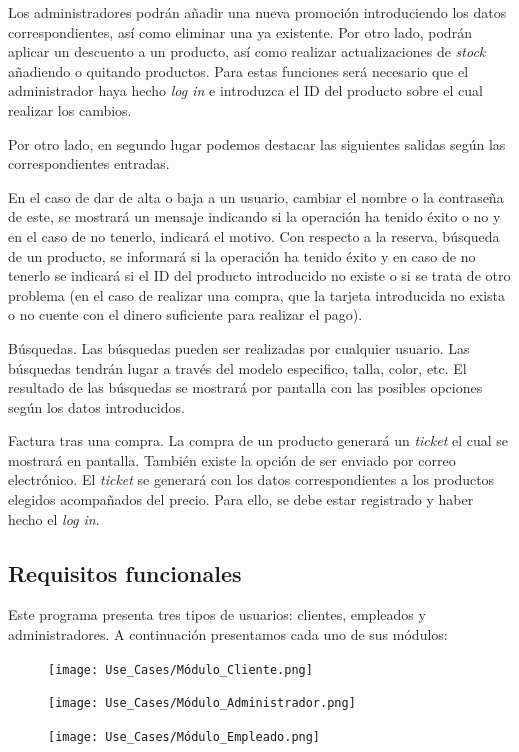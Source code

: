Los administradores podrán añadir una nueva promoción introduciendo los datos correspondientes, así como eliminar una ya existente. Por otro lado, podrán aplicar un descuento a un producto, así como realizar actualizaciones de \textit{stock} añadiendo o quitando productos. Para estas funciones será necesario que el administrador haya hecho \textit{log in} e introduzca el ID del producto sobre el cual realizar los cambios.

Por otro lado, en segundo lugar podemos destacar las siguientes salidas según las correspondientes entradas.

En el caso de dar de alta o baja a un usuario, cambiar el nombre o la contraseña de este, se mostrará un mensaje indicando si la operación ha tenido éxito o no y en el caso de no tenerlo, indicará el motivo.
Con respecto a la reserva, búsqueda de un producto, se informará si la operación ha tenido éxito y en caso de no tenerlo se indicará si el ID del producto introducido no existe o si se trata de otro problema (en el caso de realizar una compra, que la tarjeta introducida no exista o no cuente con el dinero suficiente para realizar el pago).

Búsquedas. Las búsquedas pueden ser realizadas por cualquier usuario. Las búsquedas tendrán lugar a través del modelo especifico, talla, color, etc. El resultado de las búsquedas se mostrará por pantalla con las posibles opciones según los datos introducidos.

Factura tras una compra. La compra de un producto generará un \textit{ticket} el cual se mostrará en pantalla. También existe la opción de ser enviado por correo electrónico. El \textit{ticket} se generará con los datos correspondientes a los productos elegidos acompañados del precio. Para ello, se debe estar registrado y haber hecho el \textit{log in}.



\subsection{Requisitos funcionales}
Este programa presenta tres tipos de usuarios: clientes, empleados y administradores. A continuación presentamos cada uno de sus módulos:
\begin{figure}[H]
    \centering
    \texttt{[image: Use\_Cases/Módulo\_Cliente.png]}
\end{figure}

\begin{figure}[H]
    \centering
    \texttt{[image: Use\_Cases/Módulo\_Administrador.png]}
\end{figure}
\begin{figure}[H]
    \centering
    \texttt{[image: Use\_Cases/Módulo\_Empleado.png]}
\end{figure}


